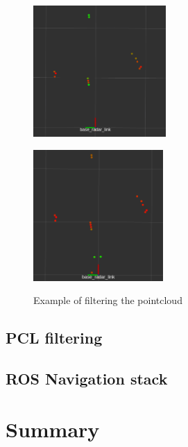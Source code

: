 \begin{figure}[h] 
    \begin{minipage}[b]{.49\linewidth}
        \includegraphics[height=5cm,width=\linewidth]{imgs/chapter4/filt.png}
        \label{fig:fft}
    \end{minipage}
    \begin{minipage}[b]{.49\linewidth}
        \includegraphics[height=5cm,width=\linewidth]{imgs/chapter4/notfilt.png}
        \subcaption{Filtered pointcloud by intensity]}
        \label{fig:fft2}
    \end{minipage}
    \caption{Example of filtering the pointcloud}
    \label{fig:distance determination}
\end{figure}




\subsection{\ac{PCL} filtering}

\subsection{ROS Navigation stack}





\section{Summary}   

